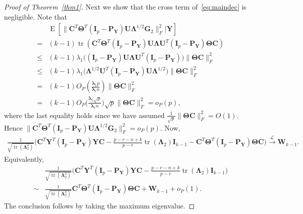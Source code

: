 \documentclass[12pt]{article} %
\DeclareMathOperator{\mytr}{tr}
\DeclareMathOperator{\myE}{E}
\newcommand{\bP}{\mathbf{P}}
\newcommand{\bY}{\mathbf{Y}}
\newcommand{\bG}{\mathbf{G}}
\newcommand{\bC}{\mathbf{C}}
\newcommand{\bI}{\mathbf{I}}
\newcommand{\bU}{\mathbf{U}}
\newcommand{\bW}{\mathbf{W}}
\newcommand{\bfsym}[1]{\ensuremath{\boldsymbol{#1}}}
\def\blambda {\bfsym {\lambda}}
\def\bLambda {\bfsym {\Lambda}}
\def\bTheta {\bfsym {\Theta}}
\theoremstyle{definition}
\begin{document}
\begin{appendices}
\begin{proof}[\textrm{Proof of Theorem~\ref{thm1}}]
Next we show that the cross term of~\eqref{eq:maindec} is negligible. Note that
$$
\begin{aligned}
    &\myE [\|\bC^T \bTheta^T (\bI_p -\bP_{\bY})\bU\bLambda^{1/2}\bG_2\|_F^2|\bY]\\
    = &
    (k-1)\mytr(\bC^T \bTheta^T (\bI_p -\bP_{\bY})\bU\bLambda \bU^T (\bI_p -\bP_{\bY})\bTheta \bC)\\
    \leq &
    (k-1)\lambda_1\big((\bI_p -\bP_{\bY})\bU\bLambda \bU^T (\bI_p -\bP_{\bY})\big)\|\bTheta \bC\|^2_F\\
    \leq &
    (k-1)\lambda_1\big(\bLambda^{1/2} \bU^T (\bI_p -\bP_{\bY})\bU \bLambda^{1/2}\big)\|\bTheta \bC\|^2_F\\
    = &
    (k-1) O_P(\frac{\blambda_1 p}{\blambda_r n})  \|\bTheta \bC\|^2_F\\
    = &
    (k-1) O_P\big(\frac{\blambda_1 \sqrt{p}}{\blambda_r n}\big) \sqrt{p}  \|\bTheta \bC\|^2_F=o_P(p),
\end{aligned}
$$
where the last equality holds since we have assumed $\frac{1}{\sqrt{p}}\|\bTheta \bC\|_F^2=O(1)$.
Hence $\|\bC^T \bTheta^T (\bI_p -\bP_{\bY})\bU\bLambda^{1/2}\bG_2\|_F^2=o_P(p)$. Now,
$$
\begin{aligned}
\frac{1}{\sqrt{\mytr(\bLambda_2^2)}}
    \big( \bC^T\bY^T(\bI_p-\bP_{\bY}) \bY \bC
    -\tfrac{p-r-n+k}{p-r}\mytr(\bLambda_2)\bI_{k-1} -\bC^T \bTheta^T (\bI_p-\bP_{\bY})\bTheta \bC\big)
\xrightarrow{\mathcal{L}} \bW_{k-1}.
\end{aligned}
$$
    Equivalently,
    $$
    \begin{aligned}
        &\frac{1}{\sqrt{\mytr(\bLambda_2^2)}} {\Big(\bC^T\bY^T(\bI_p-\bP_{\bY}) \bY \bC- \frac{p-r-n+k}{p-r}\mytr(\bLambda_2)\bI_{k-1}}\Big)\\
        \sim&
\frac{1}{\sqrt{\mytr(\bLambda_2^2)}} \bC^T \bTheta^T (\bI_p-\bP_{\bY})\bTheta \bC
        +\bW_{k-1}+o_P(1).
    \end{aligned}
    $$
    The conclusion follows by taking the maximum eigenvalue.
\end{proof}


\end{appendices}
\end{document}
